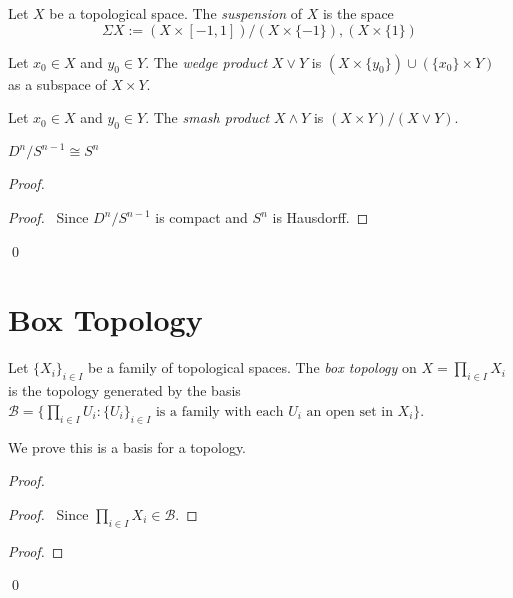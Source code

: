 \begin{df}[Suspension]
Let $X$ be a topological space. The \emph{suspension} of $X$ is the space
\[ \Sigma X := (X \times [-1,1]) / (X \times \{-1\}),(X \times \{1\}) \]
\end{df}

\begin{df}
Let $x_0 \in X$ and $y_0 \in Y$. The \emph{wedge product} $X \vee Y$ is $(X \times \{y_0\}) \cup (\{x_0\} \times Y)$ as a subspace of $X \times Y$.
\end{df}

\begin{df}
Let $x_0 \in X$ and $y_0 \in Y$. The \emph{smash product} $X \wedge Y$ is $(X \times Y) / (X \vee Y)$.
\end{df}

\begin{ex}
$D^n / S^{n-1} \cong S^n$
\end{ex}

\begin{proof}
\pf
{}
\begin{proof}
	\pf\ Since $D^n / S^{n-1}$ is compact and $S^n$ is Hausdorff.
\end{proof}
\qed
\end{proof}

\section{Box Topology}

\begin{df}
Let $\{ X_i \}_{i \in I}$ be a family of topological spaces. The \emph{box topology} on $X = \prod_{i \in I} X_i$ is the topology generated by the basis $\mathcal{B} = \{ \prod_{i \in I} U_i: \{U_i\}_{i \in I} \text{ is a family with each } U_i \text{ an open set in } X_i \}$.

We prove this is a basis for a topology.
\end{df}

\begin{proof}
\pf
{}
\begin{proof}
	\pf\ Since $\prod_{i \in I} X_i \in \mathcal{B}$.
\end{proof}
\begin{proof}
\end{proof}
\qed
\end{proof}

